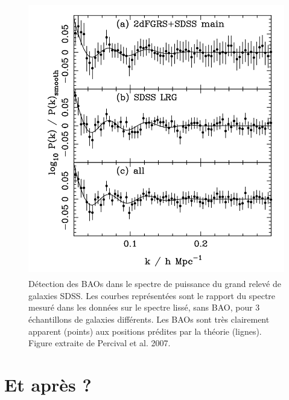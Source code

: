 \begin{figure}[htbp]
	\centering
		\includegraphics[height=12cm]{figs/percival.png}
		\caption[Les BAOs dans les relevés de galaxies]{Détection des BAOs dans le spectre de puissance du grand relevé de galaxies SDSS. Les courbes représentées sont le rapport du spectre mesuré dans les données sur le spectre lissé, sans BAO, pour 3 échantillons de galaxies différents. Les BAOs sont très clairement apparent (points) aux positions prédites par la théorie (lignes). Figure extraite de Percival et al. 2007.}
	\label{f:percival}
\end{figure}

\section{Et après ?}

